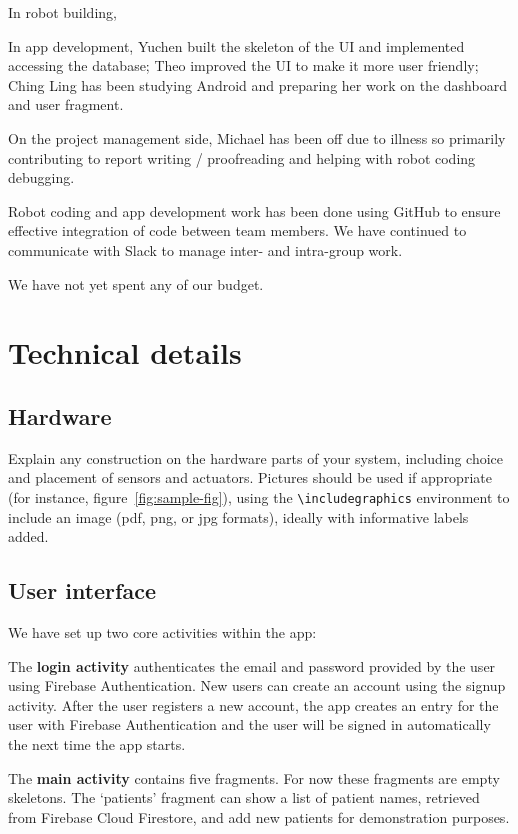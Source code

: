 \documentclass{article}
\begin{document}
In robot building, 

In app development, Yuchen built the skeleton of the UI and implemented accessing the database; Theo improved the UI to make it more user friendly; Ching Ling has been studying Android and preparing her work on the dashboard and user fragment.

On the project management side, Michael has been off due to illness so primarily contributing to report writing / proofreading and helping with robot coding debugging.

Robot coding and app development work has been done using GitHub to ensure effective integration of code between team members. We have continued to communicate with Slack to manage inter- and intra-group work.

We have not yet spent any of our budget. 


\section{Technical details}


\subsection{Hardware}

Explain any construction on the hardware parts of your system, including choice and placement of sensors and actuators. Pictures should be used if appropriate (for instance, figure~\ref{fig:sample-fig}), using the \verb+\includegraphics+ environment to include an image (pdf, png, or jpg formats), ideally with informative labels added. 

\subsection{User interface}
We have set up two core activities within the app:

The {\bf login activity} authenticates the email and password provided by the user using Firebase Authentication. New users can create an account using the signup activity. After the user registers a new account, the app creates an entry for the user with Firebase Authentication and the user will be signed in automatically the next time the app starts.

The {\bf main activity} contains five fragments. For now these fragments are empty skeletons. The `patients' fragment can show a list of patient names, retrieved from Firebase Cloud Firestore, and add new patients for demonstration purposes.
\end{document}
